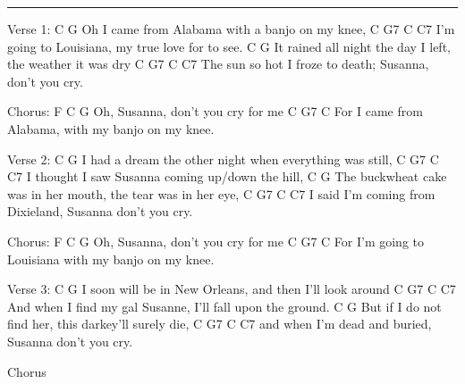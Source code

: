 \noindent\rule{\columnwidth}{1pt}
\begin{lstsong}
Verse 1:
     C                                    G
Oh I came from Alabama with a banjo on my knee,
    C                                G7     C   C7
I'm going to Louisiana, my true love for to see.
   C                                                   G
It rained all night the day I left, the weather it was dry
    C                                     G7        C    C7
The sun so hot I froze to death; Susanna, don't you cry.

Chorus:
F            C                 G
Oh, Susanna, don't you cry for me
      C                                G7    C
For I came from Alabama, with my banjo on my knee.

Verse 2:
  C                                               G
I had a dream the other night when everything was still,
  C                            G7          C     C7
I thought I saw Susanna coming up/down the hill,
    C                                                    G
The buckwheat cake was in her mouth, the tear was in her eye,
  C                                       G7        C    C7
I said I'm coming from Dixieland, Susanna don't you cry.
 

Chorus:
F            C                 G
Oh, Susanna, don't you cry for me
      C                                  G7    C
For I'm going to Louisiana with my banjo on my knee.

Verse 3:
  C                                                G
I soon will be in New Orleans, and then I'll look around
    C                                      G7      C     C7
And when I find my gal Susanne, I'll fall upon the ground.
    C                                           G
But if I do not find her, this darkey'll surely die,
    C                                 G7        C    C7
and when I'm dead and buried, Susanna don't you cry.

Chorus
\end{lstsong}
\newpage
